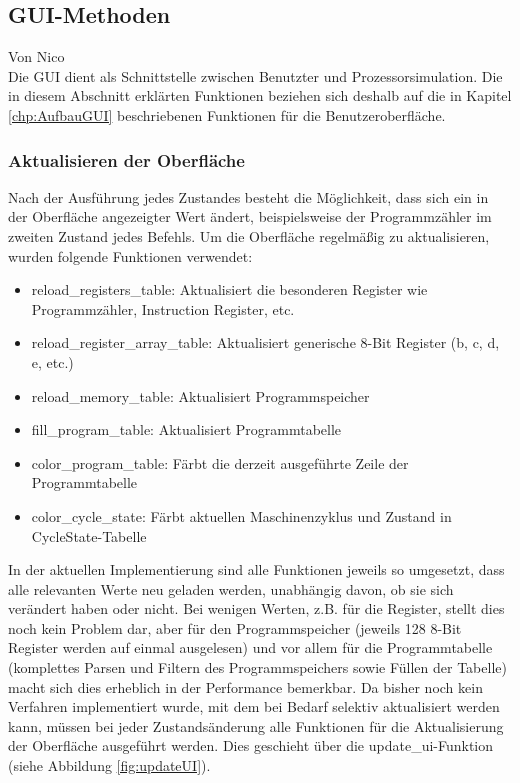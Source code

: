 \documentclass[12pt]{article}
\newcommand{\imgSpaceBefore}{\vspace{10pt}}
\begin{document}
\subsection{GUI-Methoden}\label{chapter:GUI-Methods}
Von Nico\\

\noindent
Die GUI dient als Schnittstelle zwischen Benutzter und Prozessorsimulation. Die in diesem Abschnitt erklärten Funktionen beziehen sich deshalb auf die in Kapitel \ref{chp:AufbauGUI} beschriebenen Funktionen für die Benutzeroberfläche.

\subsubsection{Aktualisieren der Oberfläche}
Nach der Ausführung jedes Zustandes besteht die Möglichkeit, dass sich ein in der Oberfläche angezeigter Wert ändert, beispielsweise der Programmzähler im zweiten Zustand jedes Befehls. Um die Oberfläche regelmäßig zu aktualisieren, wurden folgende Funktionen verwendet:\imgSpaceBefore

\begin{itemize}
	\item reload\_registers\_table: Aktualisiert die besonderen Register wie Programmzähler, Instruction Register, etc.
	\item reload\_register\_array\_table: Aktualisiert generische 8-Bit Register (b, c, d, e, etc.)
	\item reload\_memory\_table: Aktualisiert Programmspeicher
	\item fill\_program\_table: Aktualisiert Programmtabelle
	\item color\_program\_table: Färbt die derzeit ausgeführte Zeile der Programmtabelle
	\item color\_cycle\_state: Färbt aktuellen Maschinenzyklus und Zustand in CycleState-Tabelle
\end{itemize}
\noindent
In der aktuellen Implementierung sind alle Funktionen jeweils so umgesetzt, dass alle relevanten Werte neu geladen werden, unabhängig davon, ob sie sich verändert haben oder nicht. Bei wenigen Werten, z.B. für die Register, stellt dies noch kein Problem dar, aber für den Programmspeicher (jeweils 128 8-Bit Register werden auf einmal ausgelesen) und vor allem für die Programmtabelle (komplettes Parsen und Filtern des Programmspeichers sowie Füllen der Tabelle) macht sich dies erheblich in der Performance bemerkbar. Da bisher noch kein Verfahren implementiert wurde, mit dem bei Bedarf selektiv aktualisiert werden kann, müssen bei jeder Zustandsänderung alle Funktionen für die Aktualisierung der Oberfläche ausgeführt werden. Dies geschieht über die \glqq update\_ui\grqq-Funktion (siehe Abbildung \ref{fig:updateUI}).\imgSpaceBefore
\end{document}
